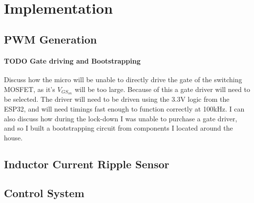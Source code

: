 \chapter{Implementation}\label{C:implementation}


\section{PWM Generation}\label{S:pwm_gen_impl}



\subsubsection{TODO Gate driving and Bootstrapping} 

Discuss how the micro will be unable to directly drive the gate of the switching MOSFET, as it's $V_{GS_{on}}$ will be too large. Because of this a gate driver will need to be selected. The driver will need to be driven using the 3.3V logic from the ESP32, and will need timings fast enough to function correctly at 100kHz. I can also discuss how during the lock-down I was unable to purchase a gate driver, and so I built a bootstrapping circuit from components I located around the house. 


\section{Inductor Current Ripple Sensor}\label{S:current_sense_impl}


\section{Control System}\label{S:control_impl}